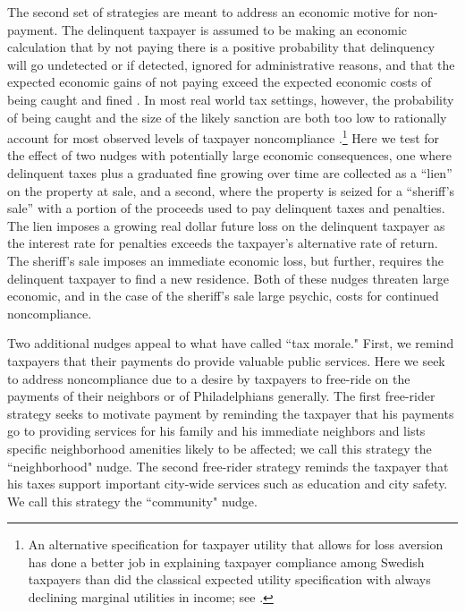 \documentclass[12pt]{article}
\begin{document}
The second set of strategies are meant to address an economic motive
for non-payment.  The delinquent taxpayer is assumed to be making an
economic calculation that by not paying there is a positive
probability that delinquency will go undetected or if detected,
ignored for administrative reasons, and that the expected economic
gains of not paying exceed the expected economic costs of being caught
and fined \cite{Allingham-Sandmo-72}.  In most real world tax
settings, however, the probability of being caught and the size of the
likely sanction are both too low to rationally account for most
observed levels of taxpayer noncompliance \cite{Alm-92}.\footnote{An
  alternative specification for taxpayer utility that allows for loss
  aversion has done a better job in explaining taxpayer compliance
  among Swedish taxpayers than did the classical expected utility
  specification with always declining marginal utilities in income;
  see . } Here we test for the effect of two nudges
with potentially large economic consequences, one where delinquent
taxes plus a graduated fine growing over time are collected as a
``lien'' on the property at sale, and a second, where the property
is seized for a ``sheriff's sale'' with a portion of the
proceeds used to pay delinquent taxes and penalties. The lien imposes
a growing real dollar future loss on the delinquent taxpayer as the
interest rate for penalties exceeds the taxpayer's alternative rate
of return. The sheriff's sale imposes an immediate economic loss,
but further, requires the delinquent taxpayer to find a new residence.
Both of these nudges threaten large economic, and in the case of the
sheriff's sale large psychic, costs for continued noncompliance.

Two additional nudges appeal to what  have called
``tax morale."  First, we remind taxpayers that their payments do
provide valuable public services.  Here we seek to address
noncompliance due to a desire by taxpayers to free-ride on the
payments of their neighbors or of Philadelphians generally.  The first
free-rider strategy seeks to motivate payment by reminding the
taxpayer that his payments go to providing services for his family and
his immediate neighbors and lists specific neighborhood amenities
likely to be affected; we call this strategy the ``neighborhood"
nudge.  The second free-rider strategy reminds the taxpayer that his
taxes support important city-wide services such as education and city
safety. We call this strategy the ``community" nudge.
  
\end{document}
